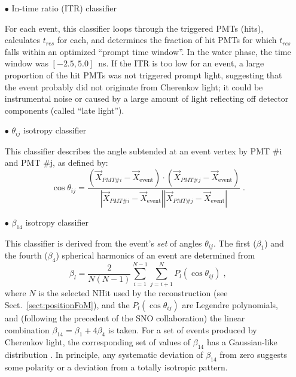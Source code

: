 \begin{itemize}
	\item[$\bullet$] In-time ratio (ITR) classifier
	
	For each event, this classifier loops through the triggered PMTs (hits), calculates $t_{res}$ for each, and determines the fraction of hit PMTs for which $t_{res}$ falls within an optimized ``prompt time window''. In the water phase, the time window was $[-2.5,5.0]$~ns. If the ITR is too low for an event, a large proportion of the hit PMTs was not triggered prompt light, suggesting that the event probably did not originate from Cherenkov light; it could be instrumental noise or caused by a large amount of light reflecting off detector components (called ``late light''). 
	
	\item[$\bullet$] $\theta_{ij}$ isotropy classifier

	This classifier describes the angle subtended at an event vertex by PMT \#i and PMT \#j, as defined by:
	\begin{equation}
	\cos\theta_{ij}=\frac{(\vec{X}_{PMT\#i}- \vec{X}_\mathrm{event})\cdot (\vec{X}_{PMT\#j}- \vec{X}_\mathrm{event})}{|\vec{X}_{PMT\#i}- \vec{X}_\mathrm{event}||\vec{X}_{PMT\#j}- \vec{X}_\mathrm{event}|}\;.
	\end{equation}
	\item[$\bullet$] $\beta_{14}$ isotropy classifier
	
	This classifier is derived from the event's {\em set} of angles $\theta_{ij}$. The first ($\beta_1$) and the fourth ($\beta_4$) spherical harmonics of an event are determined from
	\begin{equation}
	\beta_l = \frac{2}{N(N-1)}\sum_{i=1}^{N-1}\sum_{j=i+1}^N P_l(\cos\theta_{ij}) \; ,
	\end{equation}
	where $N$ is the selected NHit used by the reconstruction (see Sect.~\ref{sect:positionFoM}), and the $P_l(\cos\theta_{ij})$ are Legendre polynomials, and (following the precedent of the SNO collaboration) the linear combination $\beta_{14}=\beta_1+4\beta_4$ is taken. For a set of events produced by Cherenkov light, the corresponding set of values of $\beta_{14}$ has a Gaussian-like distribution \cite{dunmore2004separation}. In principle, any systematic deviation of $\beta_{14}$ from zero suggests some polarity or a deviation from a totally isotropic pattern.
	
\end{itemize}

